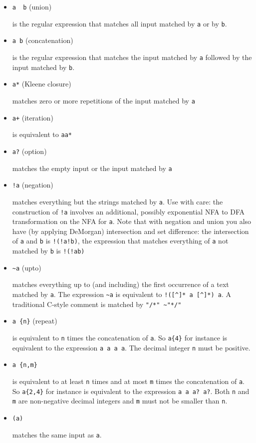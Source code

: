 \begin{itemize}
\item
  \texttt{a\ \textbar{}\ b} (union)

  is the regular expression that matches all input matched by \texttt{a}
  or by \texttt{b}.
\item
  \texttt{a\ b} (concatenation)

  is the regular expression that matches the input matched by \texttt{a}
  followed by the input matched by \texttt{b}.
\item
  \texttt{a*} (Kleene closure)

  matches zero or more repetitions of the input matched by \texttt{a}
\item
  \texttt{a+} (iteration)

  is equivalent to \texttt{aa*}
\item
  \texttt{a?} (option)

  matches the empty input or the input matched by \texttt{a}
\item
  \texttt{!a} (negation)

  matches everything but the strings matched by \texttt{a}. Use with
  care: the construction of \texttt{!a} involves an additional, possibly
  exponential NFA to DFA transformation on the NFA for \texttt{a}. Note
  that with negation and union you also have (by applying DeMorgan)
  intersection and set difference: the intersection of \texttt{a} and
  \texttt{b} is \texttt{!(!a\textbar{}!b)}, the expression that matches
  everything of \texttt{a} not matched by \texttt{b} is
  \texttt{!(!a\textbar{}b)}
\item
  \texttt{\textasciitilde{}a} (upto)

  matches everything up to (and including) the first occurrence of a
  text matched by \texttt{a}. The expression \texttt{\textasciitilde{}a}
  is equivalent to \texttt{!({[}\^{}{]}*\ a\ {[}\^{}{]}*)\ a}. A
  traditional C-style comment is matched by
  \texttt{"/*"\ \textasciitilde{}"*/"}
\item
  \texttt{a\ \{n\}} (repeat)

  is equivalent to \texttt{n} times the concatenation of \texttt{a}. So
  \texttt{a\{4\}} for instance is equivalent to the expression
  \texttt{a\ a\ a\ a}. The decimal integer \texttt{n} must be positive.
\item
  \texttt{a\ \{n,m\}}

  is equivalent to at least \texttt{n} times and at most \texttt{m}
  times the concatenation of \texttt{a}. So \texttt{a\{2,4\}} for
  instance is equivalent to the expression \texttt{a\ a\ a?\ a?}. Both
  \texttt{n} and \texttt{m} are non-negative decimal integers and
  \texttt{m} must not be smaller than \texttt{n}.
\item
  \texttt{(a)}

  matches the same input as \texttt{a}.
\end{itemize}

